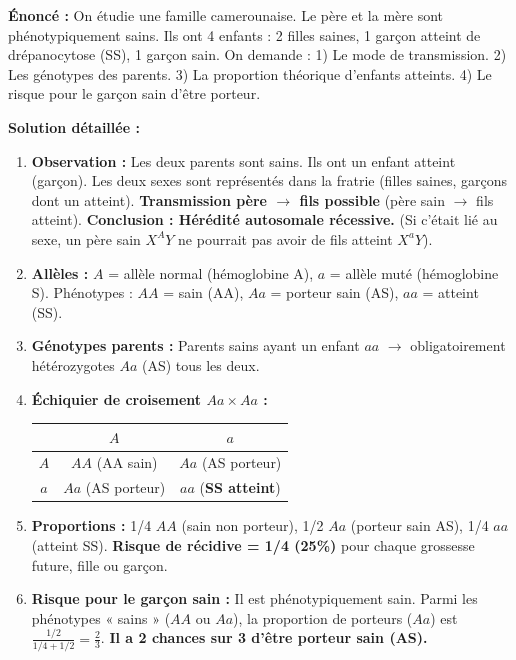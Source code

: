 \documentclass[11pt]{article}
\begin{document}
\begin{exoresolu}
\textbf{Énoncé :} On étudie une famille camerounaise. Le père et la mère sont phénotypiquement sains. Ils ont 4 enfants : 2 filles saines, 1 garçon atteint de drépanocytose (SS), 1 garçon sain. On demande : 1) Le mode de transmission. 2) Les génotypes des parents. 3) La proportion théorique d'enfants atteints. 4) Le risque pour le garçon sain d'être porteur.

\textbf{Solution détaillée :}
\begin{enumerate}
    \item \textbf{Observation :} Les deux parents sont sains. Ils ont un enfant atteint (garçon). Les deux sexes sont représentés dans la fratrie (filles saines, garçons dont un atteint). \textbf{Transmission père $\to$ fils possible} (père sain $\to$ fils atteint). \textbf{Conclusion : Hérédité autosomale récessive.} (Si c'était lié au sexe, un père sain $X^AY$ ne pourrait pas avoir de fils atteint $X^aY$).
    \item \textbf{Allèles :} $A$ = allèle normal (hémoglobine A), $a$ = allèle muté (hémoglobine S). Phénotypes : $AA$ = sain (AA), $Aa$ = porteur sain (AS), $aa$ = atteint (SS).
    \item \textbf{Génotypes parents :} Parents sains ayant un enfant $aa$ $\to$ obligatoirement hétérozygotes $Aa$ (AS) tous les deux.
    \item \textbf{Échiquier de croisement $Aa \times Aa$ :}
    \begin{center}
    \begin{tabular}{|c|c|c|}\hline
     & $A$ & $a$ \\ \hline
    $A$ & $AA$ (AA sain) & $Aa$ (AS porteur) \\ \hline
    $a$ & $Aa$ (AS porteur) & $aa$ (\textbf{SS atteint}) \\ \hline
    \end{tabular}
    \end{center}
    \item \textbf{Proportions :} 1/4 $AA$ (sain non porteur), 1/2 $Aa$ (porteur sain AS), 1/4 $aa$ (atteint SS). \textbf{Risque de récidive = 1/4 (25\%)} pour chaque grossesse future, fille ou garçon.
    \item \textbf{Risque pour le garçon sain :} Il est phénotypiquement sain. Parmi les phénotypes « sains » ($AA$ ou $Aa$), la proportion de porteurs ($Aa$) est $\frac{1/2}{1/4+1/2} = \frac{2}{3}$. \textbf{Il a 2 chances sur 3 d'être porteur sain (AS).}
\end{enumerate}
\end{exoresolu}
\end{document}
